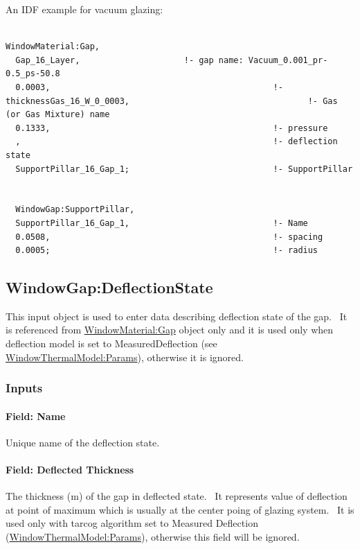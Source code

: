 An IDF example for vacuum glazing:

\begin{lstlisting}

WindowMaterial:Gap,
  Gap_16_Layer,                     !- gap name: Vacuum_0.001_pr-0.5_ps-50.8
  0.0003,                                             !- thicknessGas_16_W_0_0003,                                    !- Gas (or Gas Mixture) name
  0.1333,                                             !- pressure
  ,                                                   !- deflection state
  SupportPillar_16_Gap_1;                             !- SupportPillar


  WindowGap:SupportPillar,
  SupportPillar_16_Gap_1,                             !- Name
  0.0508,                                             !- spacing
  0.0005;                                             !- radius
\end{lstlisting}

\subsection{WindowGap:DeflectionState}\label{windowgapdeflectionstate}

This input object is used to enter data describing deflection state of the gap.~ It is referenced from \hyperref[windowmaterialgap]{WindowMaterial:Gap} object only and it is used only when deflection model is set to MeasuredDeflection (see \hyperref[windowthermalmodelparams]{WindowThermalModel:Params}), otherwise it is ignored.

\subsubsection{Inputs}\label{inputs-19-006}

\paragraph{Field: Name}\label{field-name-13-010}

Unique name of the deflection state.

\paragraph{Field: Deflected Thickness}\label{field-deflected-thickness}

The thickness (m) of the gap in deflected state.~ It represents value of deflection at point of maximum which is usually at the center poing of glazing system.~ It is used only with tarcog algorithm set to Measured Deflection (\hyperref[windowthermalmodelparams]{WindowThermalModel:Params}), otherwise this field will be ignored.

